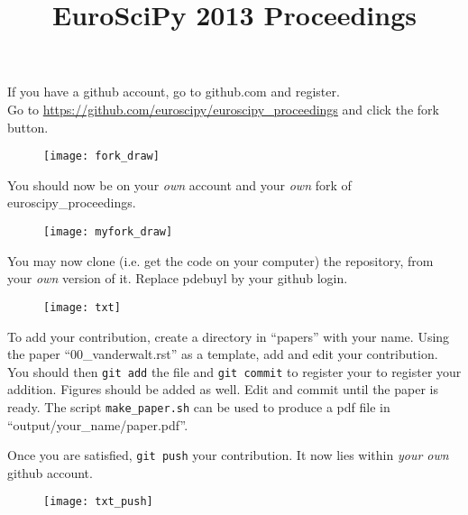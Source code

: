 \documentclass[portrait]{sciposter}
\title{EuroSciPy 2013 Proceedings}
\author{}
\institute{}
\begin{document}

\maketitle

\begin{multicols}{2}

If you have a github account, go to github.com and register.\\

Go to \url{https://github.com/euroscipy/euroscipy_proceedings} and click the
fork button.

  \begin{figure}[h]
    \centering
    \texttt{[image: fork\_draw]}
  \end{figure}

  You should now be on your {\em own} account and your {\em own} fork of
  euroscipy\_proceedings.

  \begin{figure}[h]
    \centering
    \texttt{[image: myfork\_draw]}
  \end{figure}

  You may now clone (i.e. get the code on your computer) the repository, from
  your {\em own} version of it. Replace pdebuyl by your github login.

  \begin{figure}[h]
    \centering
    \texttt{[image: txt]}
  \end{figure}

  To add your contribution, create a directory in ``papers'' with your
  name. Using the paper ``00\_vanderwalt.rst'' as a template, add and edit your
  contribution.\\

  You should then {\tt git add} the file and {\tt git commit} to register your
  to register your
  addition. Figures should be added as well. Edit and commit until the paper is
  ready. The script {\tt make\_paper.sh} can be used to produce a pdf file in
  ``output/your\_name/paper.pdf''.

  Once you are satisfied, {\tt git push} your contribution. It now lies within
  {\em your own} github account.

  \begin{figure}[h]
    \centering
    \texttt{[image: txt\_push]}
  \end{figure}


\end{multicols}
\end{document}
